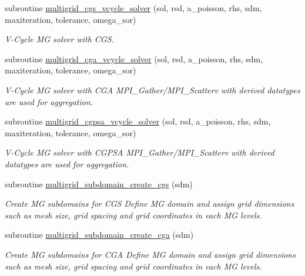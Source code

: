 \begin{DoxyCompactItemize}
subroutine \hyperlink{namespacemultigrid_aa8278baf0276649fe656c1b8f7dba30a}{multigrid\+\_\+cgs\+\_\+vcycle\+\_\+solver} (sol, rsd, a\+\_\+poisson, rhs, sdm, maxiteration, tolerance, omega\+\_\+sor)
\begin{DoxyCompactList}\small\item\em V-\/\+Cycle MG solver with C\+GS. \end{DoxyCompactList}\item 
subroutine \hyperlink{namespacemultigrid_a4295ca0af002ede1dee98750922f1f60}{multigrid\+\_\+cga\+\_\+vcycle\+\_\+solver} (sol, rsd, a\+\_\+poisson, rhs, sdm, maxiteration, tolerance, omega\+\_\+sor)
\begin{DoxyCompactList}\small\item\em V-\/\+Cycle MG solver with C\+GA  M\+P\+I\+\_\+\+Gather/\+M\+P\+I\+\_\+\+Scatterv with derived datatypes are used for aggregation. \end{DoxyCompactList}\item 
subroutine \hyperlink{namespacemultigrid_ae89565627880985244634750502edab5}{multigrid\+\_\+cgpsa\+\_\+vcycle\+\_\+solver} (sol, rsd, a\+\_\+poisson, rhs, sdm, maxiteration, tolerance, omega\+\_\+sor)
\begin{DoxyCompactList}\small\item\em V-\/\+Cycle MG solver with C\+G\+P\+SA  M\+P\+I\+\_\+\+Gather/\+M\+P\+I\+\_\+\+Scatterv with derived datatypes are used for aggregation. \end{DoxyCompactList}\end{DoxyCompactItemize}
\textbf{ }\par
\begin{DoxyCompactItemize}
\item 
subroutine \hyperlink{namespacemultigrid_acb52ce247bf637e69274d8da44d1f159}{multigrid\+\_\+subdomain\+\_\+create\+\_\+cgs} (sdm)
\begin{DoxyCompactList}\small\item\em Create MG subdomains for C\+GS  Define MG domain and assign grid dimensions such as mesh size, grid spacing and grid coordinates in each MG levels. \end{DoxyCompactList}\end{DoxyCompactItemize}

\textbf{ }\par
\begin{DoxyCompactItemize}
\item 
subroutine \hyperlink{namespacemultigrid_ae33e2e076cc087e7d149a3150c1ca1af}{multigrid\+\_\+subdomain\+\_\+create\+\_\+cga} (sdm)
\begin{DoxyCompactList}\small\item\em Create MG subdomains for C\+GA  Define MG domain and assign grid dimensions such as mesh size, grid spacing and grid coordinates in each MG levels. \end{DoxyCompactList}\end{DoxyCompactItemize}

